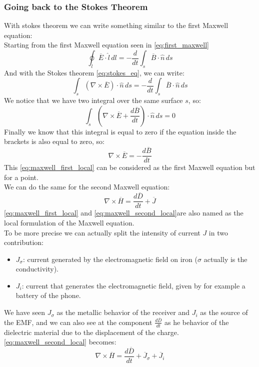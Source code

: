 \subsubsection*{Going back to the Stokes Theorem}
With stokes theorem we can write something similar to the first Maxwell equation:\\
Starting from the first Maxwell equation seen in \cref{eq:first_maxwell}
\begin{equation}
\oint_l \overline{E} \cdot \hat{l} \, dl = -\frac{d}{dt}\int_s \overline{B} \cdot \hat{n} \, ds
\end{equation} 
And with the Stokes theorem \cref{eq:stokes_eq}, we can write:
\begin{equation}
\int_s (\nabla \times \overline{E})\cdot \hat{n}\,ds=-\frac{d}{dt}\int_s \overline{B}\cdot\hat{n}\, ds
\end{equation}
We notice that we have two integral over the same surface $s$, so:
\begin{equation}
\int_s \left(\nabla\times\overline{E}+\frac{d\overline{B}}{dt}\right)\cdot\hat{n}\,ds=0
\end{equation}
Finally we know that this integral is equal to zero if the equation inside the brackets is also equal to zero, so:
\begin{equation}\label{eq:maxwell_first_local}
\nabla\times\overline{E}=-\frac{d\overline{B}}{dt}
\end{equation}
This \cref{eq:maxwell_first_local} can be considered as the first Maxwell equation but for a point.\\
We can do the same for the second Maxwell equation:
\begin{equation}\label{eq:maxwell_second_local}
\nabla\times\overline{H}=\frac{d\overline{D}}{dt}+\overline{J}
\end{equation}
\cref{eq:maxwell_first_local} and \cref{eq:maxwell_second_local}are also named as the local formulation of the Maxwell equation.\\
To be more precise we can actually split the intensity of current $J$ in two contribution:
\begin{itemize}
\item $J_\sigma$: current generated by the electromagnetic field on iron ($\sigma$ actually is the conductivity).
\item $J_i$: current that generates the electromagnetic field, given by for example a battery of the phone.
\end{itemize}
We have seen $J_\sigma$ as the metallic behavior of the receiver and $J_i$ as the source of the EMF, and we can also see at the component $\frac{d\overline{D}}{dt}$ as he behavior of the dielectric material due to the displacement of the charge.\\
\cref{eq:maxwell_second_local} becomes:
\begin{equation}
\nabla\times\overline{H}=\frac{d\overline{D}}{dt}+\overline{J}_\sigma+\overline{J}_i
\end{equation}
